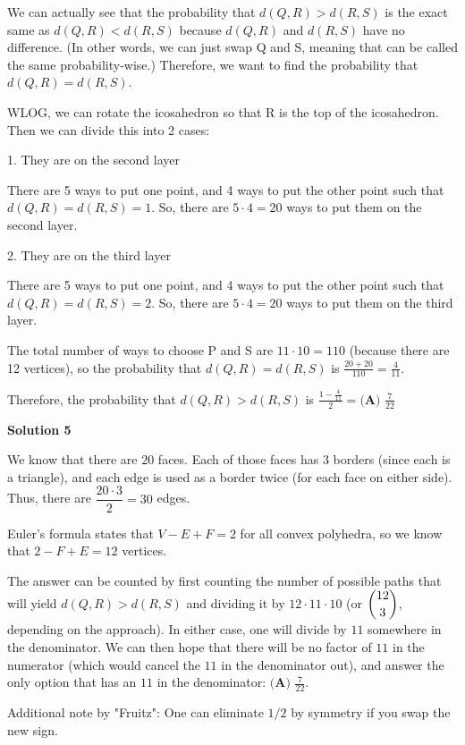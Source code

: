 \begin{enumerate}
We can actually see that the probability that $d(Q, R) > d(R, S)$ is the exact same as $d(Q, R) < d(R, S)$ because $d(Q, R)$ and $d(R, S)$ have no difference. (In other words, we can just swap Q and S, meaning that can be called the same probability-wise.) Therefore, we want to find the probability that $d(Q, R) = d(R, S)$.

 WLOG, we can rotate the icosahedron so that R is the top of the icosahedron. Then we can divide this into 2 cases:

 1. They are on the second layer

 There are 5 ways to put one point, and 4 ways to put the other point such that $d(Q, R) = d(R, S) = 1$. So, there are $5 \cdot 4 = 20$ ways to put them on the second layer.

 2. They are on the third layer

 There are 5 ways to put one point, and 4 ways to put the other point such that $d(Q, R) = d(R, S) = 2$. So, there are $5 \cdot 4 = 20$ ways to put them on the third layer.

 The total number of ways to choose P and S are $11 \cdot 10 = 110$ (because there are 12 vertices), so the probability that $d(Q, R) = d(R, S)$ is $\frac{20+20}{110} = \frac{4}{11}$.

 Therefore, the probability that $d(Q, R) > d(R, S)$ is $\frac{1 - \frac{4}{11}}{2} = \boxed{\textbf{(A) }\frac{7}{22}}$




\textbf{Solution 5}

We know that there are $20$ faces. Each of those faces has $3$ borders (since each is a triangle), and each edge is used as a border twice (for each face on either side). Thus, there are $\dfrac{20\cdot3}2=30$ edges. 

 Euler's formula states that $V-E+F=2$ for all convex polyhedra, so we know that $2-F+E=12$ vertices. 

 The answer can be counted by first counting the number of possible paths that will yield $d(Q, R) > d(R, S)$ and dividing it by $12\cdot11\cdot10$ (or $\dbinom{12}3$, depending on the approach). In either case, one will divide by $11$ somewhere in the denominator. We can then hope that there will be no factor of $11$ in the numerator (which would cancel the $11$ in the denominator out), and answer the only option that has an $11$ in the denominator: $\boxed{\textbf{(A) }\frac{7}{22}}$. 

 Additional note by "Fruitz": One can eliminate $1/2$ by symmetry if you swap the new sign.


\end{enumerate}
